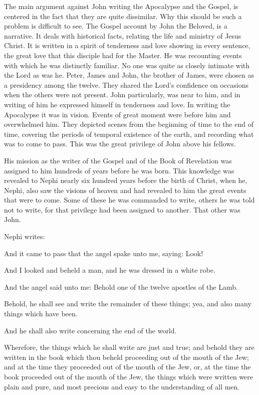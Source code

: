 The main argument against John writing the Apocalypse and the Gospel, is centered in the
fact that they are quite dissimilar. Why this should be such a problem is difficult to see. The
Gospel account by John the Beloved, is a narrative. It deals with historical facts, relating the
life and ministry of Jesus Christ. It is written in a spirit of tenderness and love showing in
every sentence, the great love that this disciple had for the Master. He was recounting events
with which he was distinctly familiar. No one was quite as closely intimate with the Lord as
was he. Peter, James and John, the brother of James, were chosen as a presidency among the
twelve. They shared the Lord's confidence on occasions when the others were not present.
John particularly, was near to him, and in writing of him he expressed himself in tenderness
and love. In writing the Apocalypse it was in vision. Events of great moment were before
him and overwhelmed him. They depicted scenes from the beginning of time to the end of
time, covering the periods of temporal existence of the earth, and recording what was to
come to pass. This was the great privilege of John above his fellows.

His mission as the writer of the Gospel and of the Book of Revelation was assigned to him
hundreds of years before he was born. This knowledge was revealed to Nephi nearly six
hundred years before the birth of Christ, when he, Nephi, also saw the visions of heaven and
had revealed to him the great events that were to come. Some of these he was commanded to
write, others he was told not to write, for that privilege had been assigned to another. That
other was John.

Nephi writes:

And it came to pass that the angel spake unto me, saying: Look!

And I looked and beheld a man, and he was dressed in a white robe.

And the angel said unto me: Behold one of the twelve apostles of the Lamb.

Behold, he shall see and write the remainder of these things; yea, and also many things which
have been.

And he shall also write concerning the end of the world.

Wherefore, the things which he shall write are just and true; and behold they are written in
the book which thou beheld proceeding out of the mouth of the Jew; and at the time they
proceeded out of the mouth of the Jew, or, at the time the book proceeded out of the mouth of
the Jew, the things which were written were plain and pure, and most precious and easy to
the understanding of all men.

